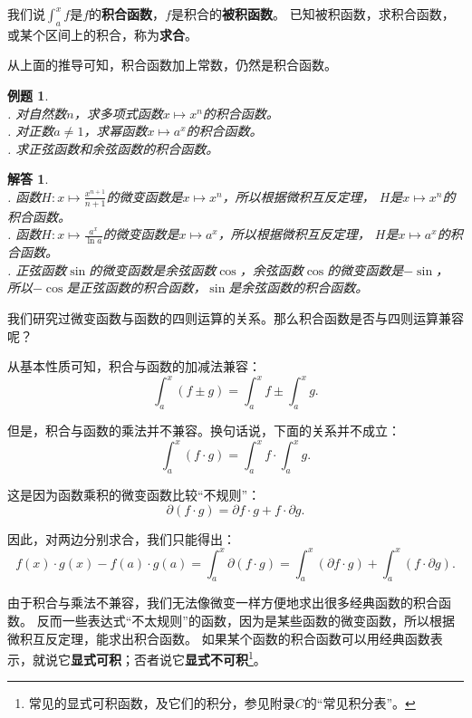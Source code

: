 \documentclass[12pt,UTF8]{ctexbook}
\newtheorem{et}{例题}[section]
\newtheorem*{so}{解答}
\begin{document}
我们说$\int_a^x f$是$f$的\textbf{积合函数}，$f$是积合的\textbf{被积函数}。
已知被积函数，求积合函数，或某个区间上的积合，称为\textbf{求合}。

从上面的推导可知，积合函数加上常数，仍然是积合函数。

\begin{et}
    \mbox{} \\
    . 对自然数$n$，求多项式函数$x\mapsto x^n$的积合函数。\\
    . 对正数$a\neq 1$，求幂函数$x\mapsto a^x$的积合函数。\\
    . 求正弦函数和余弦函数的积合函数。
\end{et}

\begin{so}
    \mbox{} \\
    . 函数$H: x\mapsto \frac{x^{n+1}}{n+1}$的微变函数是$x\mapsto x^n$，所以根据微积互反定理，
    $H$是$x\mapsto x^n$的积合函数。\\
    . 函数$H: x\mapsto \frac{a^x}{\ln{a}}$的微变函数是$x\mapsto a^x$，所以根据微积互反定理，
    $H$是$x\mapsto a^x$的积合函数。\\
    . 正弦函数$\sin$的微变函数是余弦函数$\cos$，余弦函数$\cos$的微变函数是$-\sin$，
    所以$-\cos$是正弦函数的积合函数，$\sin$是余弦函数的积合函数。
\end{so}

我们研究过微变函数与函数的四则运算的关系。那么积合函数是否与四则运算兼容呢？

从基本性质可知，积合与函数的加减法兼容：
$$ \int_a^x (f \pm g) = \int_a^x f \pm \int_a^x g. $$

但是，积合与函数的乘法并不兼容。换句话说，下面的关系并不成立：
$$ \int_a^x (f \cdot g) = \int_a^x f \cdot \int_a^x g. $$

这是因为函数乘积的微变函数比较“不规则”：
$$ \partial (f\cdot g) = \partial f \cdot g + f \cdot \partial g.$$

因此，对两边分别求合，我们只能得出：
$$ f(x)\cdot g(x) - f(a)\cdot g(a) = \int_a^x \partial (f\cdot g) = \int_a^x (\partial f \cdot g) + \int_a^x (f \cdot \partial g). $$

由于积合与乘法不兼容，我们无法像微变一样方便地求出很多经典函数的积合函数。
反而一些表达式“不太规则”的函数，因为是某些函数的微变函数，所以根据微积互反定理，能求出积合函数。
如果某个函数的积合函数可以用经典函数表示，就说它\textbf{显式可积}；否者说它\textbf{显式不可积}\footnote{常见的显式可积函数，及它们的积分，参见附录$C$的“常见积分表”。}。
\end{document}

